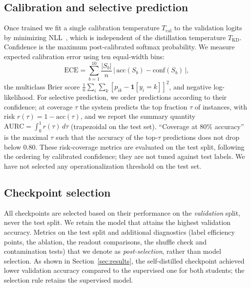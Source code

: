\documentclass[conference]{IEEEtran}
\begin{document}
\subsection{Calibration and selective prediction}
Once trained we fit a single calibration temperature $T_{\text{cal}}$ to the validation logits by minimizing NLL~\cite{guocal}, which is independent of the distillation temperature $T_{\text{KD}}$. Confidence is the maximum post-calibrated softmax probability. We measure expected calibration error using ten equal-width bins:
\begin{equation}
\mathrm{ECE}=\sum_{b=1}^{10}\frac{|S_b|}{n}\,\bigl|\,\mathrm{acc}(S_b)-\mathrm{conf}(S_b)\,\bigr|,
\end{equation}
the multiclass Brier score $\frac{1}{n}\sum_i\sum_k {\left[p_{ik}-\mathbf{1}[y_i=k]\right]}^2$, and negative log-likelihood. For selective prediction, we order predictions according to their confidence; at coverage $\tau$ the system predicts the top fraction $\tau$ of instances, with risk $r(\tau)=1-\mathrm{acc}(\tau)$, and we report the summary quantity $\mathrm{AURC}=\int_0^1 r(\tau)\,d\tau$ (trapezoidal on the test set). ``Coverage at 80\% accuracy'' is the maximal $\tau$ such that the accuracy of the top-$\tau$ predictions does not drop below 0.80. These risk-coverage metrics are evaluated on the test split, following the ordering by calibrated confidence; they are not tuned against test labels. We have not selected any operationalization threshold on the test set.

\subsection{Checkpoint selection}\label{sec:selection}
All checkpoints are selected based on their performance on the \emph{validation} split, never the test split. We retain the model that attains the highest validation accuracy. Metrics on the test split and additional diagnostics (label efficiency points, the ablation, the readout comparisons, the shuffle check and contamination tests) that we denote as \emph{post-selection}, rather than model selection. As shown in Section~\ref{sec:results}, the self-distilled checkpoint achieved lower validation accuracy compared to the supervised one for both students; the selection rule retains the supervised model.
\end{document}

